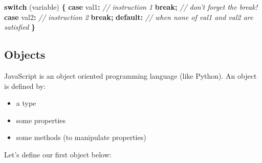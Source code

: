 \documentclass[
]{book}
\newenvironment{Shaded}{\begin{snugshade}}{\end{snugshade}}
\newcommand{\CommentTok}[1]{\textcolor[rgb]{0.56,0.35,0.01}{\textit{#1}}}
\newcommand{\ControlFlowTok}[1]{\textcolor[rgb]{0.13,0.29,0.53}{\textbf{#1}}}
\newcommand{\DataTypeTok}[1]{\textcolor[rgb]{0.13,0.29,0.53}{#1}}
\newcommand{\NormalTok}[1]{#1}
\newcommand{\OperatorTok}[1]{\textcolor[rgb]{0.81,0.36,0.00}{\textbf{#1}}}
\providecommand{\tightlist}{%
  \setlength{\itemsep}{0pt}\setlength{\parskip}{0pt}}
\begin{document}
\begin{Shaded}
\begin{Highlighting}[]
\ControlFlowTok{switch}\NormalTok{ (variable) }\OperatorTok{\{}
  \ControlFlowTok{case} \DataTypeTok{val1}\OperatorTok{:} \CommentTok{// instruction 1}
  \ControlFlowTok{break}\OperatorTok{;} \CommentTok{// don't forget the break!}
  \ControlFlowTok{case} \DataTypeTok{val2}\OperatorTok{:}  \CommentTok{// instruction 2}
  \ControlFlowTok{break}\OperatorTok{;}
  \ControlFlowTok{default}\OperatorTok{:} \CommentTok{// when none of val1 and val2 are satisfied}
\OperatorTok{\}}
\end{Highlighting}
\end{Shaded}

\hypertarget{objects}{%
\subsection{Objects}\label{objects}}

JavaScript is an object oriented programming language (like Python). An object is defined by:

\begin{itemize}
\tightlist
\item
  a type
\item
  some properties
\item
  some methods (to manipulate properties)
\end{itemize}

Let's define our first object below:
\end{document}
